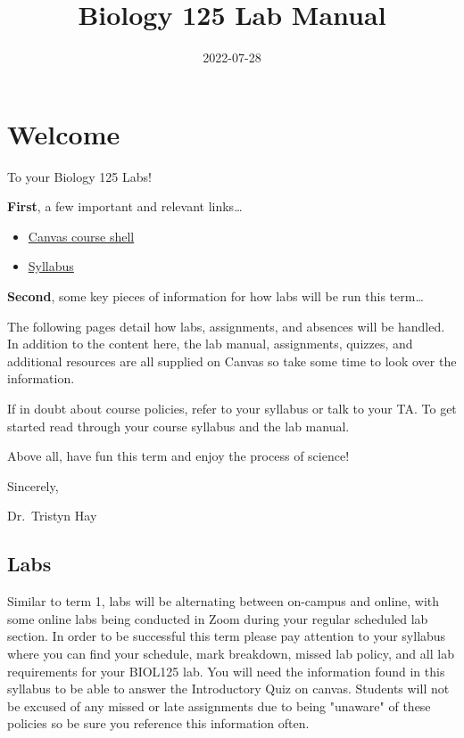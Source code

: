 \documentclass[
]{book}
\title{Biology 125 Lab Manual}
\author{}
\date{\vspace{-2.5em}2022-07-28}
\providecommand{\tightlist}{%
  \setlength{\itemsep}{0pt}\setlength{\parskip}{0pt}}
\begin{document}
\maketitle

{
\setcounter{tocdepth}{1}
\tableofcontents
}
\hypertarget{welcome}{%
\chapter*{Welcome}\label{welcome}}

To your Biology 125 Labs!

\textbf{First}, a few important and relevant links\ldots{}

\begin{itemize}
\tightlist
\item
  \href{https://canvas.ubc.ca/courses/90148}{Canvas course shell}
\item
  \href{https://canvas.ubc.ca/courses/90148/assignments/syllabus}{Syllabus}
\end{itemize}

\textbf{Second}, some key pieces of information for how labs will be run this term\ldots{}

The following pages detail how labs, assignments, and absences will be handled. In addition to the content here, the lab manual, assignments, quizzes, and additional resources are all supplied on Canvas so take some time to look over the information.

If in doubt about course policies, refer to your syllabus or talk to your TA. To get started read through your course syllabus and the lab manual.

Above all, have fun this term and enjoy the process of science!

Sincerely,

Dr.~Tristyn Hay

\hypertarget{labs}{%
\section*{Labs}\label{labs}}

Similar to term 1, labs will be alternating between on-campus and online, with some online labs being conducted in Zoom during your regular scheduled lab section. In order to be successful this term please pay attention to your syllabus where you can find your schedule, mark breakdown, missed lab policy, and all lab requirements for your BIOL125 lab. You will need the information found in this syllabus to be able to answer the Introductory Quiz on canvas. Students will not be excused of any missed or late assignments due to being "unaware" of these policies so be sure you reference this information often.
\end{document}
